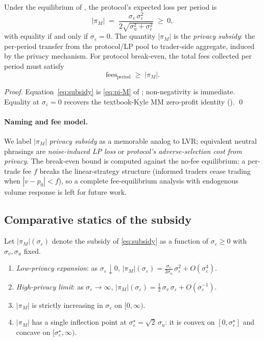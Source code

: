\documentclass[runningheads]{llncs}
\newcommand{\sigv}{\sigma_v}
\newcommand{\sigu}{\sigma_u}
\newcommand{\sige}{\sigma_\varepsilon}
\begin{document}
\begin{theorem}
\label{thm:welfare}
Under the equilibrium of , the protocol's
expected loss per period is
\begin{equation}
|\pi_M| \;=\; \frac{\sigv\,\sige^2}{2\sqrt{\sigu^2 + \sige^2}}
        \;\geq\; 0,
\label{eq:subsidy}
\end{equation}
with equality if and only if $\sige = 0$. The quantity $|\pi_M|$
is the \emph{privacy subsidy}: the per-period transfer from the
protocol/LP pool to trader-side aggregate, induced by the privacy
mechanism. For protocol break-even, the total fees collected per
period must satisfy
\[
\mathrm{fees}_{\text{period}} \;\geq\; |\pi_M|.
\]
\end{theorem}

\begin{proof}
Equation~\eqref{eq:subsidy} is \eqref{eq:pi-M} of ;
non-negativity is immediate. Equality at $\sige = 0$ recovers
the textbook-Kyle MM zero-profit identity (). \qed
\end{proof}

\paragraph{Naming and fee model.}
We label $|\pi_M|$ \emph{privacy subsidy} as a memorable analog to
LVR; equivalent neutral phrasings are \emph{noise-induced LP loss}
or \emph{protocol's adverse-selection cost from privacy}. The
break-even bound is computed against the no-fee equilibrium: a
per-trade fee $f$ breaks the linear-strategy structure (informed
traders cease trading when $|v - p_0| < f$), so a complete
fee-equilibrium analysis with endogenous volume response is left
for future work.

\subsection{Comparative statics of the subsidy}

\begin{proposition}
\label{prop:subsidy-asymptotics}
Let $|\pi_M|(\sige)$ denote the subsidy of \eqref{eq:subsidy} as a
function of $\sige \geq 0$ with $\sigv, \sigu$ fixed.
\begin{enumerate}[leftmargin=*]
\item \emph{Low-privacy expansion}: as $\sige \downarrow 0$,
$|\pi_M|(\sige) = \tfrac{\sigv}{2\sigu}\,\sige^2 + O(\sige^4)$.
\item \emph{High-privacy limit}: as $\sige \to \infty$,
$|\pi_M|(\sige) = \tfrac{1}{2}\,\sigv\,\sige + O(\sige^{-1})$.
\item $|\pi_M|$ is strictly increasing in $\sige$ on $[0, \infty)$.
\item $|\pi_M|$ has a single inflection point at $\sige^\star =
\sqrt{2}\,\sigu$: it is convex on $[0, \sige^\star]$ and concave on
$[\sige^\star, \infty)$.
\end{enumerate}
\end{proposition}
\end{document}
